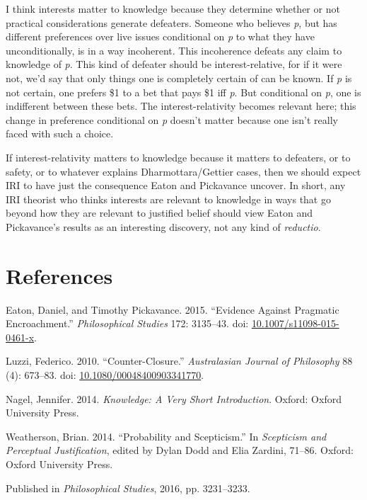 \documentclass[
  11pt,
  letterpaper,
  DIV=11,
  numbers=noendperiod,
  twoside]{scrartcl}
\newlength{\cslhangindent}
\newenvironment{CSLReferences}[2] %
 {\begin{list}{}{%
  \setlength{\itemindent}{0pt}
  \setlength{\leftmargin}{0pt}
  \setlength{\parsep}{0pt}
  \ifodd #1
   \setlength{\leftmargin}{\cslhangindent}
   \setlength{\itemindent}{-1\cslhangindent}
  \fi
  \setlength{\itemsep}{#2\baselineskip}}}
 {\end{list}}
\begin{document}
I think interests matter to knowledge because they determine whether or
not practical considerations generate defeaters. Someone who believes
\emph{p}, but has different preferences over live issues conditional on
\emph{p} to what they have unconditionally, is in a way incoherent. This
incoherence defeats any claim to knowledge of \emph{p}. This kind of
defeater should be interest-relative, for if it were not, we'd say that
only things one is completely certain of can be known. If \emph{p} is
not certain, one prefers \$1 to a bet that pays \$1 iff \emph{p}. But
conditional on \emph{p}, one is indifferent between these bets. The
interest-relativity becomes relevant here; this change in preference
conditional on \emph{p} doesn't matter because one isn't really faced
with such a choice.

If interest-relativity matters to knowledge because it matters to
defeaters, or to safety, or to whatever explains Dharmottara/Gettier
cases, then we should expect IRI to have just the consequence Eaton and
Pickavance uncover. In short, any IRI theorist who thinks interests are
relevant to knowledge in ways that go beyond how they are relevant to
justified belief should view Eaton and Pickavance's results as an
interesting discovery, not any kind of \emph{reductio}.

\section*{References}\label{references}

\label{refs}
\begin{CSLReferences}{1}{0}
Eaton, Daniel, and Timothy Pickavance. 2015. {``Evidence Against
Pragmatic Encroachment.''} \emph{Philosophical Studies} 172: 3135--43.
doi:
\href{https://doi.org/10.1007/s11098-015-0461-x}{10.1007/s11098-015-0461-x}.

Luzzi, Federico. 2010. {``Counter-Closure.''} \emph{Australasian Journal
of Philosophy} 88 (4): 673--83. doi:
\href{https://doi.org/10.1080/00048400903341770}{10.1080/00048400903341770}.

Nagel, Jennifer. 2014. \emph{Knowledge: A Very Short Introduction}.
Oxford: Oxford University Press.

Weatherson, Brian. 2014. {``Probability and Scepticism.''} In
\emph{Scepticism and Perceptual Justification}, edited by Dylan Dodd and
Elia Zardini, 71--86. Oxford: Oxford University Press.

\end{CSLReferences}



\noindent Published in\emph{
Philosophical Studies}, 2016, pp. 3231–3233.
\end{document}

